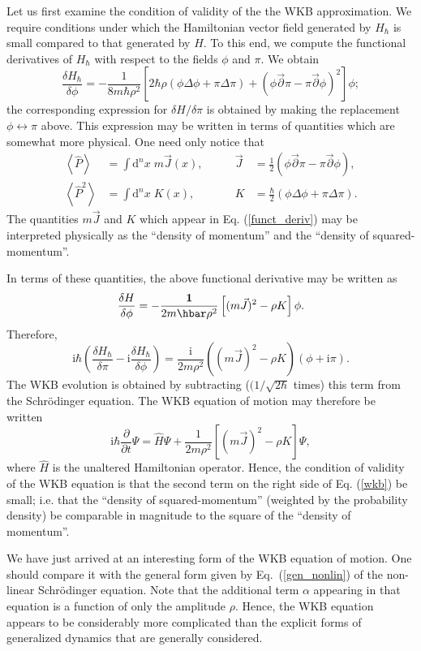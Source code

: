 \documentclass[12pt,aps,eqsecnum,tighten]{revtex4-2}
\def\be{\begin{equation}}
\def\ee{\end{equation}}
\def\a{\alpha}
\def\d{{\mathrm d}}
\def\i{\mathrm{i}}
\def\1{{\bf 1}}
\begin{document}
Let us first examine the condition of validity of the the WKB
approximation.  We require conditions under which the
Hamiltonian vector field generated by $H_\hbar$ is small compared to
that generated by $H$.  To this end, we compute the functional
derivatives of $H_\hbar$ with respect to the fields $\phi$ and $\pi$.
We obtain
%
\be \label{funct_deriv}
\frac{\delta H_\hbar}{\delta \phi} = 
-\frac{1}{8m\hbar\rho^2} \left[2\hbar\rho\left( \phi\Delta\phi 
+\pi\Delta\pi \right) + \left( \phi \vec{\partial}\pi -
\pi\vec{\partial}\phi \right)^2\right] \phi;
\ee
%
the corresponding expression for $\delta H / \delta\pi$ is obtained by
making the replacement $\phi \leftrightarrow \pi$ above.  This
expression may be written in terms of quantities which are somewhat
more physical.  One need only notice that
%
\be
\begin{array}{rlrl}
\left< \hat{P} \right> &= \int \d^n \! x \; m\vec{J}(x), \quad
\quad& \vec{J} &= \frac{1}{2} ( \phi\vec{\partial}\pi -
\pi\vec{\partial}\phi ), \\
%
\left< \hat{P}^2 \right> &= \int \d^n \! x \; K(x), \quad
\quad& K &= \frac{\hbar}{2} ( \phi\Delta\phi +
\pi\Delta\pi ).
\end{array}
\ee
%
The quantities $m\vec{J}$ and $K$ which appear in
Eq. (\ref{funct_deriv}) may be interpreted physically as the ``density
of momentum'' and the ``density of squared-momentum''.

In terms of these quantities, the above functional derivative may be
written as
%
\be
\frac{\delta H}{\delta \phi} = -\frac{\1}{2m\hbar\rho^2} \left[
(m\vec{J})^2 - \rho K \right] \phi.
\ee
%
Therefore,
%
\be
\i\hbar\left( \frac{\delta H_\hbar}{\delta \pi} - \i
\frac{\delta H_\hbar}{\delta \phi} \right) =
\frac{\i}{2m\rho^2}\left( (m\vec{J})^2 - \rho K \right)
(\phi + \i\pi). 
\ee
%
The WKB evolution is obtained by subtracting ($(1/\sqrt{2\hbar}$
times) this term from the Schr\"odinger equation.  The WKB equation of
motion may therefore be written
%
\be\label{wkb}
\i\hbar \frac{\partial}{\partial t}\Psi = \hat{H}\Psi + 
\frac{1}{2m\rho^2}\left[(m\vec{J})^2 - \rho K \right] \Psi,
\ee
%
where $\hat{H}$ is the unaltered Hamiltonian operator. Hence, the
condition of validity of the WKB equation is that the second term on
the right side of Eq. (\ref{wkb}) be small; i.e. that the ``density of
squared-momentum'' (weighted by the probability density) be comparable
in magnitude to the square of the ``density of momentum''.


We have just arrived at an interesting form of the WKB equation of
motion. One should compare it with the general form given by
Eq.~(\ref{gen_nonlin}) of the non-linear Schr\"odinger equation. Note
that the additional term $\a$ appearing in that equation is a function
of only the amplitude $\rho$. Hence, the WKB equation appears to be
considerably more complicated than the explicit forms of generalized
dynamics that are generally considered.
\end{document}
